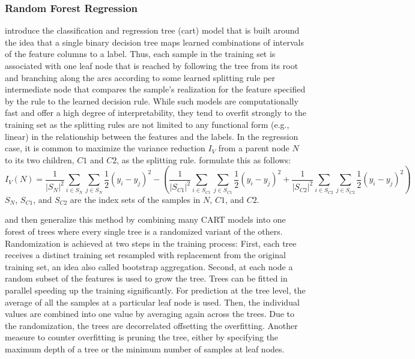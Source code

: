 \subsubsection{Random Forest Regression}
\label{rf}

\cite{breiman1984} introduce the classification and regression tree
    (\gls{cart}) model that is built around the idea that a single binary
    decision tree maps learned combinations of intervals of the feature
    columns to a label.
Thus, each sample in the training set is associated with one leaf node that
    is reached by following the tree from its root and branching along the
    arcs according to some learned splitting rule per intermediate node that
    compares the sample's realization for the feature specified by the rule to
    the learned decision rule.
While such models are computationally fast and offer a high degree of
    interpretability, they tend to overfit strongly to the training set as
    the splitting rules are not limited to any functional form (e.g., linear)
    in the relationship between the features and the labels.
In the regression case, it is common to maximize the variance reduction $I_V$
    from a parent node $N$ to its two children, $C1$ and $C2$, as the
    splitting rule.
\cite{breiman1984} formulate this as follows:
$$
I_V(N)
=
\frac{1}{|S_N|^2} \sum_{i \in S_N} \sum_{j \in S_N}
    \frac{1}{2} (y_i - y_j)^2
- \left(
    \frac{1}{|S_{C1}|^2} \sum_{i \in S_{C1}} \sum_{j \in S_{C1}}
        \frac{1}{2} (y_i - y_j)^2
    +
    \frac{1}{|S_{C2}|^2} \sum_{i \in S_{C2}} \sum_{j \in S_{C2}}
        \frac{1}{2} (y_i - y_j)^2
\right)
$$
$S_N$, $S_{C1}$, and $S_{C2}$ are the index sets of the samples in $N$, $C1$,
    and $C2$. 

\cite{ho1998} and then \cite{breiman2001} generalize this method by combining
    many CART models into one forest of trees where every single tree is
    a randomized variant of the others.
Randomization is achieved at two steps in the training process:
First, each tree receives a distinct training set resampled with replacement
    from the original training set, an idea also called bootstrap
    aggregation.
Second, at each node a random subset of the features is used to grow the tree.
Trees can be fitted in parallel speeding up the training significantly.
For prediction at the tree level, the average of all the samples at a
    particular leaf node is used.
Then, the individual values are combined into one value by averaging again
    across the trees.
Due to the randomization, the trees are decorrelated offsetting the
    overfitting.
Another measure to counter overfitting is pruning the tree, either by
    specifying the maximum depth of a tree or the minimum number of samples
    at leaf nodes.

